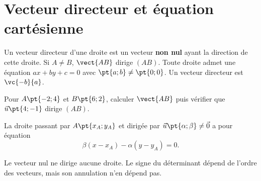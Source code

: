 \section{Vecteur directeur et équation cartésienne}
\begin{keypoint}[Définition]
Un vecteur directeur d'une droite est un vecteur \textbf{non nul} ayant la direction de cette droite. Si $A\ne B$, $\vect{AB}$ dirige $(AB)$.
Toute droite admet une équation $ax+by+c=0$ avec $\pt{a;b}\ne\pt{0;0}$. Un vecteur directeur est $\vc{-b}{a}$.
\end{keypoint}
\begin{example}Pour $A\pt{-2;4}$ et $B\pt{6;2}$, calculer $\vect{AB}$ puis vérifier que $\vec u\pt{4;-1}$ dirige $(AB)$.\end{example}
\begin{keypoint}
La droite passant par $A\pt{x_A;y_A}$ et dirigée par $\vec u\pt{\alpha;\beta}\ne\vec0$ a pour équation
\[\beta(x-x_A)-\alpha(y-y_A)=0.\]
\end{keypoint}
\begin{pitfall}Le vecteur nul ne dirige aucune droite. Le signe du déterminant dépend de l'ordre des vecteurs, mais son annulation n'en dépend pas.\end{pitfall}

